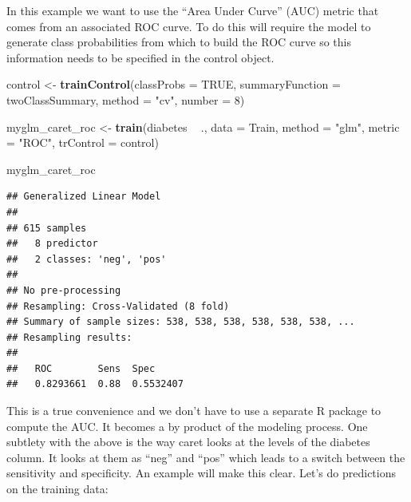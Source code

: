 \documentclass[
]{book}
\newenvironment{Shaded}{\begin{snugshade}}{\end{snugshade}}
\newcommand{\DataTypeTok}[1]{\textcolor[rgb]{0.13,0.29,0.53}{#1}}
\newcommand{\DecValTok}[1]{\textcolor[rgb]{0.00,0.00,0.81}{#1}}
\newcommand{\KeywordTok}[1]{\textcolor[rgb]{0.13,0.29,0.53}{\textbf{#1}}}
\newcommand{\NormalTok}[1]{#1}
\newcommand{\OperatorTok}[1]{\textcolor[rgb]{0.81,0.36,0.00}{\textbf{#1}}}
\newcommand{\OtherTok}[1]{\textcolor[rgb]{0.56,0.35,0.01}{#1}}
\newcommand{\StringTok}[1]{\textcolor[rgb]{0.31,0.60,0.02}{#1}}
\begin{document}
In this example we want to use the ``Area Under Curve'' (AUC) metric that comes from an associated ROC curve. To do this will require the model to generate class probabilities from which to build the ROC curve so this information needs to be specified in the control object.

\begin{Shaded}
\begin{Highlighting}[]
\NormalTok{control <-}\StringTok{ }\KeywordTok{trainControl}\NormalTok{(}\DataTypeTok{classProbs =} \OtherTok{TRUE}\NormalTok{,}
                        \DataTypeTok{summaryFunction =}\NormalTok{ twoClassSummary,}
                        \DataTypeTok{method =} \StringTok{"cv"}\NormalTok{,}
                        \DataTypeTok{number =} \DecValTok{8}\NormalTok{)}

\NormalTok{myglm_caret_roc <-}\StringTok{ }\KeywordTok{train}\NormalTok{(diabetes }\OperatorTok{~}\StringTok{ }\NormalTok{.,}
                         \DataTypeTok{data =}\NormalTok{ Train,}
                         \DataTypeTok{method =} \StringTok{"glm"}\NormalTok{,}
                         \DataTypeTok{metric =} \StringTok{"ROC"}\NormalTok{,}
                         \DataTypeTok{trControl =}\NormalTok{ control)}

\NormalTok{myglm_caret_roc}
\end{Highlighting}
\end{Shaded}

\begin{verbatim}
## Generalized Linear Model 
## 
## 615 samples
##   8 predictor
##   2 classes: 'neg', 'pos' 
## 
## No pre-processing
## Resampling: Cross-Validated (8 fold) 
## Summary of sample sizes: 538, 538, 538, 538, 538, 538, ... 
## Resampling results:
## 
##   ROC        Sens  Spec     
##   0.8293661  0.88  0.5532407
\end{verbatim}

This is a true convenience and we don't have to use a separate R package to compute the AUC. It becomes a by product of the modeling process. One subtlety with the above is the way caret looks at the levels of the diabetes column. It looks at them as ``neg'' and ``pos'' which leads to a switch between the sensitivity and specificity. An example will make this clear. Let's do predictions on the training data:

\begin{Shaded}
\end{Shaded}
\end{document}
